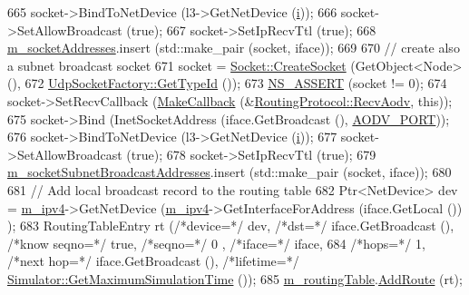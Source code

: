 \begin{DoxyCode}
665   socket->BindToNetDevice (l3->GetNetDevice (\hyperlink{bernuolliDistribution_8m_a6f6ccfcf58b31cb6412107d9d5281426}{i}));
666   socket->SetAllowBroadcast (\textcolor{keyword}{true});
667   socket->SetIpRecvTtl (\textcolor{keyword}{true});
668   \hyperlink{classns3_1_1aodv_1_1RoutingProtocol_aa3263563cbbd735faafbf17fd4e28a10}{m\_socketAddresses}.insert (std::make\_pair (socket, iface));
669 
670   \textcolor{comment}{// create also a subnet broadcast socket}
671   socket = \hyperlink{classns3_1_1Socket_ad448a62bb50ad3dbac59c879a885a8d2}{Socket::CreateSocket} (GetObject<Node> (),
672                                  \hyperlink{classns3_1_1UdpSocketFactory_ad5b47e944de8861e3dc2b6de1ccbdf5b}{UdpSocketFactory::GetTypeId} ());
673   \hyperlink{assert_8h_a6dccdb0de9b252f60088ce281c49d052}{NS\_ASSERT} (socket != 0);
674   socket->SetRecvCallback (\hyperlink{group__makecallbackmemptr_ga9376283685aa99d204048d6a4b7610a4}{MakeCallback} (&\hyperlink{classns3_1_1aodv_1_1RoutingProtocol_a08c44000f66533e69bde85d68d75c354}{RoutingProtocol::RecvAodv}, \textcolor{keyword}{
      this}));
675   socket->Bind (InetSocketAddress (iface.GetBroadcast (), \hyperlink{classns3_1_1aodv_1_1RoutingProtocol_ac4a3de99b49ad5f6efc9b71a700f7ec4}{AODV\_PORT}));
676   socket->BindToNetDevice (l3->GetNetDevice (\hyperlink{bernuolliDistribution_8m_a6f6ccfcf58b31cb6412107d9d5281426}{i}));
677   socket->SetAllowBroadcast (\textcolor{keyword}{true});
678   socket->SetIpRecvTtl (\textcolor{keyword}{true});
679   \hyperlink{classns3_1_1aodv_1_1RoutingProtocol_a3516a9ee6cc1a0ebde0fdc08680dc7c4}{m\_socketSubnetBroadcastAddresses}.insert (std::make\_pair (socket, iface));
680 
681   \textcolor{comment}{// Add local broadcast record to the routing table}
682   Ptr<NetDevice> dev = \hyperlink{classns3_1_1aodv_1_1RoutingProtocol_aee33006b1f9d8b24d4722037ff3fec98}{m\_ipv4}->GetNetDevice (\hyperlink{classns3_1_1aodv_1_1RoutingProtocol_aee33006b1f9d8b24d4722037ff3fec98}{m\_ipv4}->GetInterfaceForAddress (iface.GetLocal ())
      );
683   RoutingTableEntry rt (\textcolor{comment}{/*device=*/} dev, \textcolor{comment}{/*dst=*/} iface.GetBroadcast (), \textcolor{comment}{/*know seqno=*/} \textcolor{keyword}{true}, \textcolor{comment}{/*seqno=*/} 0
      , \textcolor{comment}{/*iface=*/} iface,
684                                     \textcolor{comment}{/*hops=*/} 1, \textcolor{comment}{/*next hop=*/} iface.GetBroadcast (), \textcolor{comment}{/*lifetime=*/} 
      \hyperlink{classns3_1_1Simulator_aa8dbab888dca7bf3528421d2c5e67f99}{Simulator::GetMaximumSimulationTime} ());
685   \hyperlink{classns3_1_1aodv_1_1RoutingProtocol_a4e1003a34c8adc96db71096d88c98ae0}{m\_routingTable}.\hyperlink{classns3_1_1aodv_1_1RoutingTable_a579e562e38e67d510de1ff2c87806c76}{AddRoute} (rt);

\end{DoxyCode}
